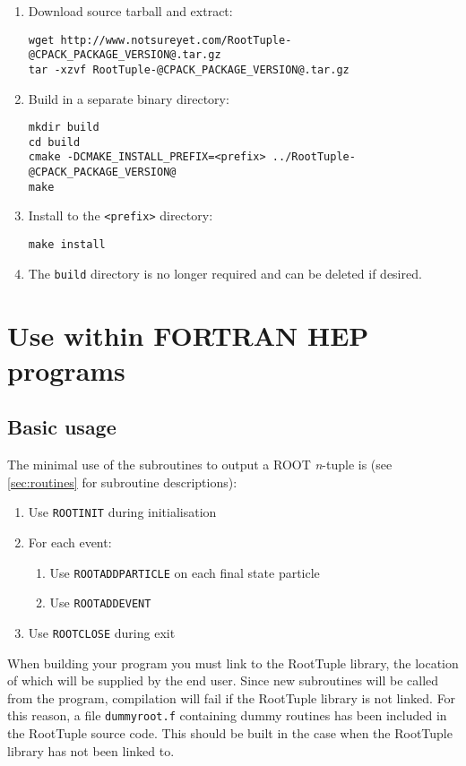 \documentclass[a4paper,12pt]{article}
\begin{document}
\begin{enumerate}
    \item Download source tarball and extract:\begin{verbatim}
wget http://www.notsureyet.com/RootTuple-@CPACK_PACKAGE_VERSION@.tar.gz
tar -xzvf RootTuple-@CPACK_PACKAGE_VERSION@.tar.gz\end{verbatim}
    \item Build in a separate binary directory:\begin{verbatim}
mkdir build
cd build
cmake -DCMAKE_INSTALL_PREFIX=<prefix> ../RootTuple-@CPACK_PACKAGE_VERSION@
make\end{verbatim}
    \item Install to the \verb|<prefix>| directory:\begin{verbatim}
make install\end{verbatim}
    \item The \verb|build| directory is no longer required and can be deleted if desired.
\end{enumerate}

\section{Use within FORTRAN HEP programs}
\label{sec:usage}
\subsection{Basic usage}
The minimal use of the subroutines to output a ROOT \emph{n}-tuple is (see \textsection\ref{sec:routines} for subroutine descriptions):
\begin{enumerate}
    \item Use \verb|ROOTINIT| during initialisation
    \item For each event:
    \begin{enumerate}
        \item Use \verb|ROOTADDPARTICLE| on each final state particle
        \item Use \verb|ROOTADDEVENT|
    \end{enumerate}
    \item Use \verb|ROOTCLOSE| during exit
\end{enumerate}

When building your program you must link to the RootTuple library, the location of which will be supplied by the end user. Since new subroutines will be called from the program, compilation will fail if the RootTuple library is not linked. For this reason, a file \verb|dummyroot.f| containing dummy routines has been included in the RootTuple source code. This should be built in the case when the RootTuple library has not been linked to.
\end{document}
